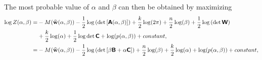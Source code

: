 \documentclass[11pt]{article}
\newcommand{\wmp}{\widehat{\mathbf{w}}}
\def\A{\boldsymbol{\sf A}}
\def\B{\boldsymbol{\sf B}}
\def\C{\boldsymbol{\sf C}}
\def\W{\boldsymbol{\sf W}}
\begin{document}
The most probable value of $\alpha$ and $\beta$ can then be obtained by maximizing
\begin{equation}
  \begin{split}
    \log Z(\alpha,\beta) =& -M(\wmp(\alpha,\beta))-\frac{1}{2}\log\left(\det\left[\A(\alpha,\beta) \right]\right) + \frac{k}{2}\log(2\pi)+\frac{n}{2}\log(\beta)+\frac{1}{2}\log\left(\det \W \right)\\
    &+ \frac{k}{2} \log(\alpha) + \frac{1}{2} \log \det \C +\log(p(\alpha,\beta))+constant,\\
    =& -M(\wmp(\alpha,\beta))-\frac{1}{2}\log\left(\det\left[ \beta\B+\alpha \C\right]\right) +\frac{n}{2}\log(\beta)+ \frac{k}{2} \log(\alpha) +  \log(p(\alpha,\beta))+constant,\\
  \end{split}
\end{equation}
\end{document}
